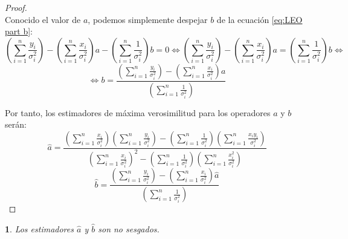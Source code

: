 \documentclass[11pt,a4paper,spanish]{article}
\numberwithin{equation}{section}
\numberwithin{table}{section}
\numberwithin{figure}{section}
\theoremstyle{definition}
\theoremstyle{remark}
\theoremstyle{definition}
\theoremstyle{remark}
\theoremstyle{plain}
\newtheorem{prop}{\protect\propositionname}[section]
\theoremstyle{plain}
\theoremstyle{plain}
\theoremstyle{plain}
\theoremstyle{plain}
\theoremstyle{plain}
\providecommand{\propositionname}{Proposición}
\begin{document}
\begin{proof}
\[		\]
		Conocido el valor de $a$, podemos simplemente despejar $b$ de la
		ecuación \vref{eq:LEO part b}:
		\[
		\left(\sum_{i=1}^{n}\frac{y_{i}}{\sigma_{i}^{2}}\right)-\left(\sum_{i=1}^{n}\frac{x_{i}}{\sigma_{i}^{2}}\right)a-\left(\sum_{i=1}^{n}\frac{1}{\sigma_{i}^{2}}\right)b=0\iff\left(\sum_{i=1}^{n}\frac{y_{i}}{\sigma_{i}^{2}}\right)-\left(\sum_{i=1}^{n}\frac{x_{i}}{\sigma_{i}^{2}}\right)a=\left(\sum_{i=1}^{n}\frac{1}{\sigma_{i}^{2}}\right)b\iff
		\]
		\[
		\iff b=\frac{\left(\sum_{i=1}^{n}\frac{y_{i}}{\sigma_{i}^{2}}\right)-\left(\sum_{i=1}^{n}\frac{x_{i}}{\sigma_{i}^{2}}\right)a}{\left(\sum_{i=1}^{n}\frac{1}{\sigma_{i}^{2}}\right)}
		\]
		
		Por tanto, los estimadores de máxima verosimilitud para los operadores
		$a$ y $b$ serán:
		\[
		\hat{a}=\frac{\left(\sum_{i=1}^{n}\frac{x_{i}}{\sigma_{i}^{2}}\right)\left(\sum_{i=1}^{n}\frac{y_{i}}{\sigma_{i}^{2}}\right)-\left(\sum_{i=1}^{n}\frac{1}{\sigma_{i}^{2}}\right)\left(\sum_{i=1}^{n}\frac{x_{i}y_{i}}{\sigma_{i}^{2}}\right)}{\left(\sum_{i=1}^{n}\frac{x_{i}}{\sigma_{i}^{2}}\right)^{2}-\left(\sum_{i=1}^{n}\frac{1}{\sigma_{i}^{2}}\right)\left(\sum_{i=1}^{n}\frac{x_{i}^{2}}{\sigma_{i}^{2}}\right)}
		\]
		\[
		\hat{b}=\frac{\left(\sum_{i=1}^{n}\frac{y_{i}}{\sigma_{i}^{2}}\right)-\left(\sum_{i=1}^{n}\frac{x_{i}}{\sigma_{i}^{2}}\right)\hat{a}}{\left(\sum_{i=1}^{n}\frac{1}{\sigma_{i}^{2}}\right)}
		\]
	\end{proof}
	\begin{prop}
		Los estimadores $\hat{a}$ y $\hat{b}$ son no sesgados.
	\end{prop}
\end{document}
